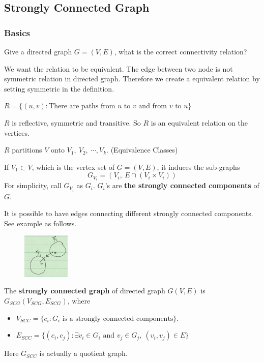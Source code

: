 \documentclass[en,hazy,blue,screen,14pt]{elegantnote}
\begin{document}
\subsection{Strongly Connected Graph}

\subsubsection{Basics}
Give a directed graph $G = (V, E)$, what is the correct connectivity relation?

We want the relation to be equivalent. The edge between two node is not 
symmetric relation in directed graph. Therefore we create a equivalent relation 
by setting symmetric in the definition.

\begin{definition}
 $R = \{(u, v): \text{There are paths from $u$ to $v$ and from $v$ to $u$}\}$
\end{definition}

$R$ is reflective, symmetric and transitive. So $R$ is an equivalent relation 
on the vertices.

\begin{definition}
$R$ partitions $V$ onto $V_1,~V_2,~\cdots, V_k$. (Equivalence Classes)

If $V_1 \subset V$, which is the vertex set of $G = (V, E)$, it induces the 
sub-graphs
\[G_{V_i} = (V_i, ~E \cap (V_i \times V_i) )\]
For simplicity, call $G_{V_i}$ as $G_i$. $G_i$'s are \textbf{the 
strongly connected components} of $G$.
\end{definition}


It is possible to have edges connecting different strongly connected 
components. See example as follows.
\begin{figure}[H]
\centering
\includegraphics[width=0.2\textwidth]{edge-strongly-connected-components.png}
\end{figure}

\begin{definition}
 The \textbf{strongly connected graph} of directed graph $G(V, E)$ is 
$G_{SCG}(V_{SCG}, E_{SCG})$, where
\begin{itemize}
 \item $V_{SCC} = \{c_i: G_i \text{ is a strongly connected components}\}$.
 \item $E_{SCC} = \{(c_i, c_j): \exists v_i \in G_i \text{ and }v_j \in G_j, 
~(v_i, v_j) \in E \}$
\end{itemize}
\end{definition}
Here $G_{SCC}$ is actually a quotient graph.
\end{document}
